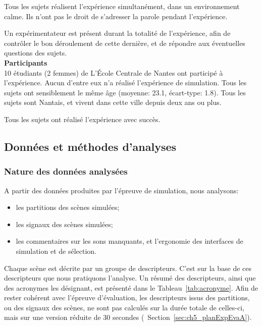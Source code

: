 Tous les sujets réalisent l'expérience simultanément, dans un environnement calme. Ils n'ont pas le droit de s'adresser la parole pendant l'expérience. 

Un expérimentateur est présent durant la totalité de l'expérience, afin de contrôler le bon déroulement de cette dernière, et de répondre aux éventuelles questions des sujets.  \\

\textbf{Participants} \\

10 étudiants (2 femmes) de L’École Centrale de Nantes ont participé à l'expérience. Aucun d'entre eux n'a réalisé l'expérience de simulation. Tous les sujets ont sensiblement le même âge (moyenne: 23.1, écart-type: 1.8). Tous les sujets sont Nantais, et vivent dans cette ville depuis deux ans ou plus.

Tous les sujets ont réalisé l'expérience avec succès.

\subsection{Données et méthodes d'analyses}

\subsubsection{Nature des données analysées}
\label{sec:ch5_dataType1}

A partir des données produites par l'épreuve de simulation, nous analysons:

\begin{itemize}
\item les partitions des scènes simulées;
\item les signaux des scènes simulées;
\item les commentaires sur les sons manquants, et l'ergonomie des interfaces de simulation et de sélection.
\end{itemize}

Chaque scène est décrite par un groupe de descripteurs. C'est sur la base de ces descripteurs que nous pratiquons l'analyse. Un résumé des descripteurs, ainsi que des acronymes les désignant, est présenté dans le Tableau~\ref{tab:acronyme}. Afin de rester cohérent avec l'épreuve d'évaluation, les descripteurs issus des partitions, ou des signaux des scènes, ne sont pas calculés sur la durée totale de celles-ci, mais sur une version réduite de 30 secondes (\cf~Section~\ref{sec:ch5_planExpEvaA}). 

